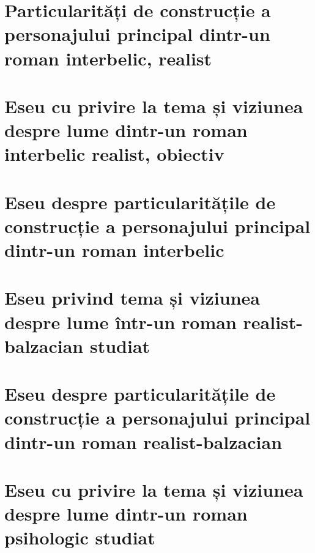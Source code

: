 \documentclass{eseuri_bac_romana}
\begin{document}
\chapter{Particularități de construcție a personajului principal din\-tr-un roman interbelic, realist}



\chapter{Eseu cu privire la tema și viziunea despre lume dintr-un roman interbelic realist, obiectiv}


\chapter{Eseu despre particularitățile de construcție a personajului principal dintr-un roman interbelic}



\chapter{Eseu privind tema și viziunea despre lume într-un roman realist-balzacian studiat}


\chapter{Eseu despre particularitățile de construcție a personajului principal dintr-un roman realist-balzacian}



\chapter{Eseu cu privire la tema și viziunea despre lume dintr-un roman psihologic studiat}

\end{document}
